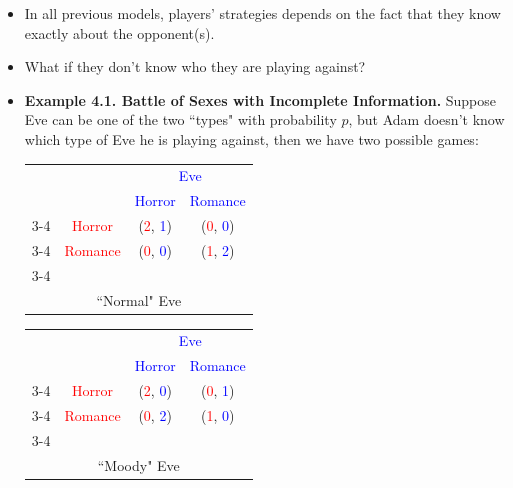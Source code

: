 \documentclass[notitlepage]{article}
\begin{document}
\begin{itemize}
    \item In all previous models, players' strategies depends on the fact that they know exactly about the opponent(s).
    \item What if they don't know who they are playing against?
    \item \textbf{Example 4.1. Battle of Sexes with Incomplete Information.} Suppose Eve can be one of the two ``types" with probability \(p\), but Adam doesn't know which type of Eve he is playing against, then we have two possible games:

    \newpage
    \begin{table}[h]
    \centering
    \begin{tabular}{llcc}
    &&
    \multicolumn{2}{c}{\textcolor{blue}{Eve}}  \\&& 
    \textcolor{blue}{Horror} & 
    \textcolor{blue}{Romance} 
    \\ \cline{3-4} 
    \multirow{2}{*}{\textcolor{red}{Adam}} & 
    \multicolumn{1}{c|}{\textcolor{red}{Horror}} & 
    \multicolumn{1}{c|}{(\textcolor{red}{2}, \textcolor{blue}{1})} &
    \multicolumn{1}{c|}{(\textcolor{red}{0}, \textcolor{blue}{0})} 
    \\ \cline{3-4} & 
    \multicolumn{1}{c|}{\textcolor{red}{Romance}} & 
    \multicolumn{1}{c|}{(\textcolor{red}{0}, \textcolor{blue}{0})} &
    \multicolumn{1}{c|}{(\textcolor{red}{1}, \textcolor{blue}{2})} 
    \\ \cline{3-4}
    \multicolumn{4}{c}{} \\
    \multicolumn{4}{c}{``Normal" Eve}
    \end{tabular}
    \end{table}

    \begin{table}[h]
    \centering
    \begin{tabular}{llcc}
    &&
    \multicolumn{2}{c}{\textcolor{blue}{Eve}}  \\&& 
    \textcolor{blue}{Horror} & 
    \textcolor{blue}{Romance} 
    \\ \cline{3-4} 
    \multirow{2}{*}{\textcolor{red}{Adam}} & 
    \multicolumn{1}{c|}{\textcolor{red}{Horror}} & 
    \multicolumn{1}{c|}{(\textcolor{red}{2}, \textcolor{blue}{0})} &
    \multicolumn{1}{c|}{(\textcolor{red}{0}, \textcolor{blue}{1})} 
    \\ \cline{3-4} & 
    \multicolumn{1}{c|}{\textcolor{red}{Romance}} & 
    \multicolumn{1}{c|}{(\textcolor{red}{0}, \textcolor{blue}{2})} &
    \multicolumn{1}{c|}{(\textcolor{red}{1}, \textcolor{blue}{0})} 
    \\ \cline{3-4}
    \multicolumn{4}{c}{} \\
    \multicolumn{4}{c}{``Moody" Eve}
    \end{tabular}
    \end{table}


\end{itemize}
\end{document}

